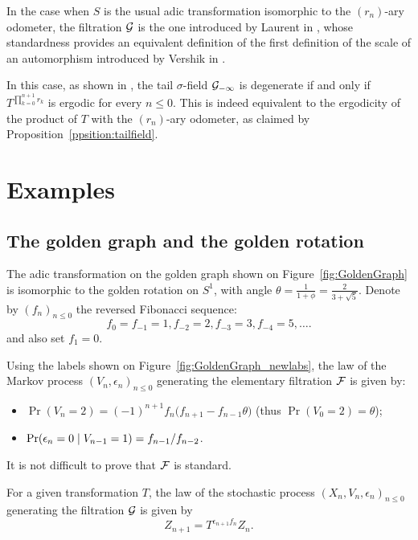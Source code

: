 \documentclass[12pt,a4paper]{article}
\begin{document}
In the case when $S$ is the usual adic transformation isomorphic to 
the $(r_n)$-ary odometer, 
the filtration $\mathcal{G}$ is the one introduced by Laurent in \cite{LauXLV}, 
whose standardness provides an equivalent definition of the first 
definition of the scale of an automorphism introduced by Vershik in \cite{thescale}. 

In this case, as shown in \cite{LauXLV}, the tail $\sigma$-field $\mathcal{G}_{-\infty}$ 
is degenerate if and only if $T^{\prod_{k=0}^{n+1}r_k}$ is ergodic for every $n \leq 0$. 
This is indeed equivalent to the ergodicity of the product of $T$ 
with the $(r_n)$-ary odometer, as claimed by Proposition~\ref{ppsition:tailfield}.

\section{Examples}
 


\subsection{The golden graph and the golden rotation}

The adic transformation on the golden graph shown on Figure~\ref{fig:GoldenGraph} 
is isomorphic to the golden rotation on $S^1$, 
with angle $\theta=\frac{1}{1+\phi}=\frac{2}{3+\sqrt{5}}$. 
Denote by 
\({(f_n)}_{n \leq 0}\) the reversed Fibonacci sequence: 
\[
  f_0=f_{-1}=1, f_{-2}=2, f_{-3}=3, f_{-4}=5, \ldots.
\]
and also set $f_1=0$. 

Using the labels shown on Figure~\ref{fig:GoldenGraph_newlabs}, 
the law of the Markov process 
${(V_n, \epsilon_n)}_{n \leq 0}$ generating the elementary filtration $\mathcal{F}$ 
is given by:
\begin{itemize}
\item $\Pr(V_n = 2) =  {(-1)}^{n+1} f_n\bigl(f_{n+1} - f_{n-1} \theta\bigr)$ 
(thus $\Pr(V_0=2)=\theta$);

\item $\Pr(\epsilon_n=0 \mid V_{n-1}=1) = f_{n-1}/f_{n-2}$. 
\end{itemize}

It is not difficult to prove that $\mathcal{F}$ is standard. 

For a given transformation $T$, the law of the stochastic process 
${(X_n, V_n, \epsilon_n)}_{n \leq 0}$ generating the filtration $\mathcal{G}$ 
is given by 
$$
Z_{n+1} = T^{\epsilon_{n+1}f_n}Z_n.
$$
\end{document}
